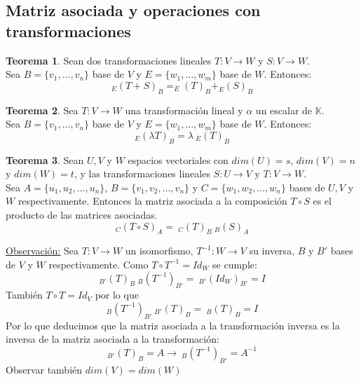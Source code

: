 \documentclass[10pt]{article}
\theoremstyle{definition}
\newtheorem{theorem}{Teorema}[section]
\begin{document}
\subsection{Matriz asociada y operaciones con transformaciones}
\begin{theorem}
	Sean dos transformaciones lineales $T:V\to W$ y $S:V\to W$.\\
	Sea $B=\{v_1,\dots,v_n\}$ base de $V$ y $E=\{w_1,\dots,w_m\}$ base de $W$. Entonces:
	$$_E(T+S)_B= _E(T)_B+_E(S)_B$$
\end{theorem}
\begin{theorem}
	Sea $T:V\to W$ una transformación lineal y $\alpha$ un escalar de $\mathbb{K}$.\\
	Sea $B=\{v_1,\dots,v_n\}$ base de $V$ y $E=\{w_1,\dots,w_m\}$ base de $W$. Entonces:
	$$_E(\lambda T)_B=\lambda \ _E(T)_B$$
\end{theorem}
\begin{theorem}
	Sean $U, V$ y $W$ espacios vectoriales con $dim(U)=s$, $dim(V)=n$ y $dim(W)=t$, y las transformaciones lineales $S:U\rightarrow V$ y $T:V\rightarrow W$.
	\\Sea $A=\{u_1,u_2,\dots,u_n\}$, $B=\{v_1,v_2,\dots,v_n\}$ y $C=\{w_1,w_2,\dots,w_n\}$ bases de $U, V$ y $W$ respectivamente. Entonces la matriz asociada a la composición $T\circ S$ es el producto de las matrices asociadas.
	$$
		_C(T\circ S)_A=\ _C(T)_B\ _B(S)_A
	$$
\end{theorem}
\underline{Observación:} Sea $T:V\rightarrow W$ un isomorfismo, $T^{-1}:W\rightarrow V$ su inversa, $B$ y $B'$ bases de $V$ y $W$ respectivamente. Como $T\circ T^{-1}=Id_W$ se cumple:
$$
	_{B'}(T)_B \ _B(T^{-1})_{B'}=\ _{B'}(Id_W)_{B'}=I
$$
También $T\circ T=Id_V$ por lo que
$$
	_B(T^{-1})_{B'} \ _{B'}(T)_B=\ _B(T)_B=I
$$
Por lo que deducimos que la matriz asociada a la transformación inversa es la inversa de la matriz asociada a la transformación:
$$
	_{B'}(T)_B=A\rightarrow \ _B(T^{-1})_{B'}=A^{-1}
$$
Observar también $dim(V)=dim(W)$
\end{document}
